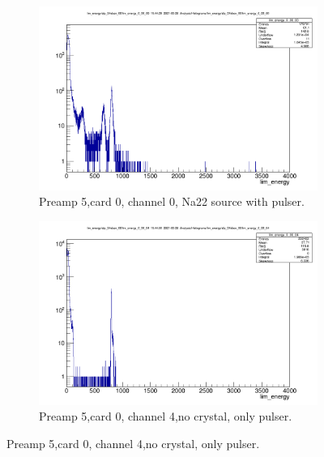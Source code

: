 \documentclass{report}
\begin{document}
\begin{figure}[!htb]
  \centering
  \begin{subfigure}[b]{0.45\textwidth}
    \includegraphics[width=\linewidth]{preamp5_lim_energy_card0_ch0.png}
    \caption{Preamp 5,card 0, channel 0, Na22 source with pulser.}
  \end{subfigure}
  \begin{subfigure}[b]{0.45\textwidth}
    \includegraphics[width=\linewidth]{preamp5_lim_energy_card0_ch4_no_crystal.png}
    \caption{Preamp 5,card 0, channel 4,no crystal, only pulser.}
  \end{subfigure}
\end{figure}
\end{document}
